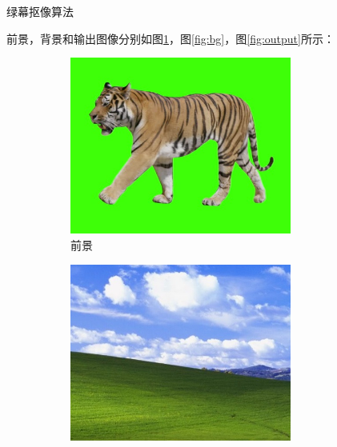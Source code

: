 \documentclass[UTF8]{article}
\begin{document}
\begin{algorithm}[H]
    \caption{绿幕抠像算法}
    \label{alg:green-screen}
\end{algorithm}
    
前景，背景和输出图像分别如图\ref{fig:fg}，图\ref{fig:bg}，图\ref{fig:output}所示：
\begin{figure}[htbp]
    \centering
    \begin{subfigure}{0.33\textwidth}
      \centering
      \includegraphics[width=0.8\textwidth]{img/fg.png}
      \caption{前景}
      \label{fig:fg} %
    \end{subfigure}
    \begin{subfigure}{0.33\textwidth}
      \centering
      \includegraphics[width=0.8\textwidth]{img/bg.png}

\end{subfigure}
\end{figure}
\end{document}
